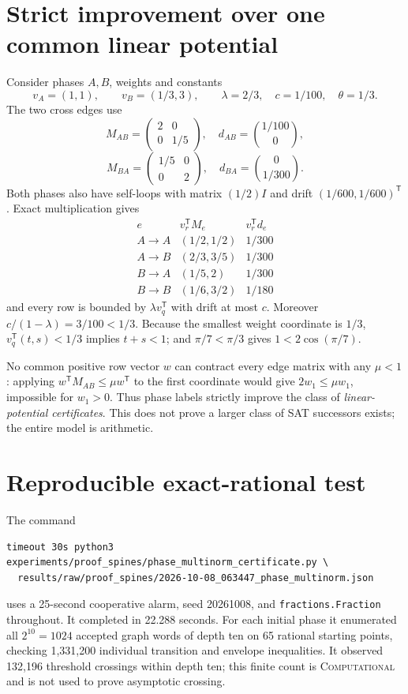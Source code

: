 \documentclass[11pt]{article}
\begin{document}
\section{Strict improvement over one common linear potential}
Consider phases \(A,B\), weights and constants
\[
v_A=(1,1),\qquad v_B=(1/3,3),\qquad
\lambda=2/3,\quad c=1/100,\quad\theta=1/3.
\]
The two cross edges use
\[
M_{AB}=\begin{pmatrix}2&0\\0&1/5\end{pmatrix},\quad
d_{AB}=\binom{1/100}{0},
\]
\[
M_{BA}=\begin{pmatrix}1/5&0\\0&2\end{pmatrix},\quad
d_{BA}=\binom{0}{1/300}.
\]
Both phases also have self-loops with matrix \((1/2)I\) and drift
\((1/600,1/600)^{\mathsf T}\).  Exact multiplication gives
\[
\begin{array}{c|c|c}
e & v_r^{\mathsf T}M_e & v_r^{\mathsf T}d_e\\
\hline
A\to A&(1/2,1/2)&1/300\\
A\to B&(2/3,3/5)&1/300\\
B\to A&(1/5,2)&1/300\\
B\to B&(1/6,3/2)&1/180
\end{array}
\]
and every row is bounded by
\(\lambda v_q^{\mathsf T}\) with drift at most \(c\).
Moreover \(c/(1-\lambda)=3/100<1/3\).
Because the smallest weight coordinate is \(1/3\),
\(v_q^{\mathsf T}(t,s)<1/3\) implies \(t+s<1\); and
\(\pi/7<\pi/3\) gives \(1<2\cos(\pi/7)\).

No common positive row vector \(w\) can contract every edge matrix with any
\(\mu<1\): applying
\(w^{\mathsf T}M_{AB}\le\mu w^{\mathsf T}\) to the first coordinate would
give \(2w_1\le\mu w_1\), impossible for \(w_1>0\).
Thus phase labels strictly improve the class of \emph{linear-potential
certificates}.  This does not prove a larger class of SAT successors exists;
the entire model is arithmetic.

\section{Reproducible exact-rational test}
The command
\begin{verbatim}
timeout 30s python3 experiments/proof_spines/phase_multinorm_certificate.py \
  results/raw/proof_spines/2026-10-08_063447_phase_multinorm.json
\end{verbatim}
uses a 25-second cooperative alarm, seed 20261008, and
\texttt{fractions.Fraction} throughout.  It completed in 22.288 seconds.
For each initial phase it enumerated all \(2^{10}=1024\) accepted graph
words of depth ten on 65 rational starting points, checking 1,331,200
individual transition and envelope inequalities.  It observed 132,196
threshold crossings within depth ten; this finite count is
\textsc{Computational} and is not used to prove asymptotic crossing.
\end{document}

